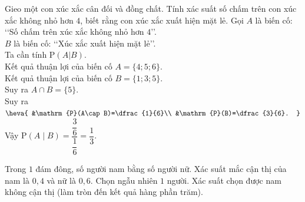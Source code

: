 \begin{bt}%

Gieo một con xúc xắc cân đối và đồng chất. Tính xác suất số chấm trên con xúc xắc không nhỏ hơn $4$, biết rằng con xúc xắc xuất hiện mặt lẻ.
\loigiai
{
Gọi $A$ là biến cố: \lq\lq Số chấm trên xúc xắc không nhỏ hơn $4$\rq\rq.\\
$B$ là biến cố: \lq\lq Xúc xắc xuất hiện mặt lẻ\rq\rq.\\
Ta cần tính $\mathrm{P}(A| B)$.\\
Kết quả thuận lợi của biến cố $A=\{4;5;6\}$.\\
Kết quả thuận lợi của biến cố $B=\{1;3;5\}$.\\
Suy ra $A\cap B=\{5\}$.\\
Suy ra $\heva{
&\mathrm{P}(A\cap B)=\dfrac{1}{6}\\
&\mathrm{P}(B)=\dfrac{3}{6}.
}$\\
Vậy $\mathrm{P}(A\mid B)=\dfrac{\dfrac{3}{6}}{\dfrac{1}{6}}=\dfrac{1}{3}$.
}
\end{bt}

\begin{bt}%

	Trong $1$ đám đông, số người nam bằng số người nữ. Xác suất mắc cận thị của nam là $0{,}4$ và nữ là $0{,}6$. Chọn ngẫu nhiên $1$ người. Xác suất chọn được nam không cận thị (làm tròn đến kết quả hàng phần trăm).
\end{bt}

